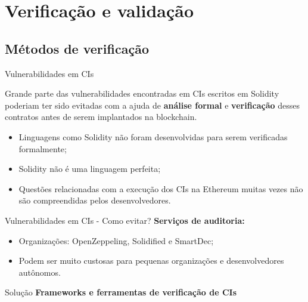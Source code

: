 \section{Verificação e validação}
\subsection{Métodos de verificação}

\begin{frame}{Vulnerabilidades em CIs}
    \begin{block}{}
    Grande parte das vulnerabilidades encontradas em CIs escritos em Solidity poderiam ter sido evitadas com a ajuda de \textbf{análise formal} e \textbf{verificação} desses contratos antes de serem implantados na blockchain.
    \end{block}
    \begin{itemize}
        \item Linguagens como Solidity não foram desenvolvidas para serem verificadas formalmente;
        \item Solidity não é uma linguagem perfeita;
        \item Questões relacionadas com a execução dos CIs na Ethereum muitas vezes não são compreendidas pelos desenvolvedores.
    \end{itemize}
\end{frame}

\begin{frame}{Vulnerabilidades em CIs - Como evitar?}
    \textbf{Serviços de auditoria:}
    \begin{itemize}
        \item Organizações: OpenZeppeling, Solidified e SmartDec;
        \item Podem ser muito custosas para pequenas organizações e desenvolvedores autônomos.
    \end{itemize}
    \begin{exampleblock}{Solução}
    \textbf{Frameworks e ferramentas de verificação de CIs}
    \end{exampleblock}
\end{frame}

